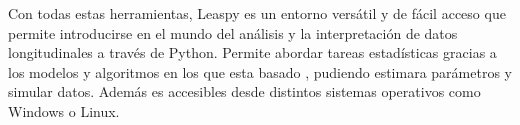 \documentclass[12pt]{article}
\begin{document}
Con todas estas herramientas, Leaspy es un entorno versátil y de fácil acceso que permite introducirse en el mundo del análisis y la interpretación de datos longitudinales a través de Python. Permite abordar tareas estadísticas gracias a los modelos y algoritmos en los que esta basado , pudiendo estimara parámetros y simular datos. Además es accesibles desde distintos sistemas operativos como Windows o Linux.
\end{document}
